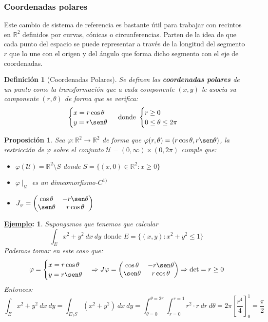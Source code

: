\documentclass[10pt,a4paper,openright]{book}
\theoremstyle{break}
\newtheorem*{defi}{Definición}
\newtheorem*{prop}{Proposición}
\newtheorem*{ej}{\underline{Ejemplo}:}
\newcommand{\dif}[1]{\ d#1}
\begin{document}
\subsubsection{Coordenadas polares}
Este cambio de sistema de referencia es bastante útil para trabajar con recintos en $\mathbb{R}^2$ definidos por curvas, cónicas o circunferencias. Parten de la idea de que cada punto del espacio se puede representar a través de la longitud del segmento $r$ que lo une con el origen y del ángulo que forma dicho segmento con el eje de coordenadas.

\begin{defi}[Coordenadas Polares]
Se definen las \textbf{coordenadas polares} de un punto como la transformación que a cada componente $(x,y)$ le asocia su componente $(r, \theta)$ de forma que se verifica:
$$\begin{cases} x = r \cos \theta \\ y = r \sen \theta \end{cases} \mbox{ donde } \begin{cases} r \ge 0\\ 0 \le \theta \le 2\pi \end{cases}$$
\end{defi}

\begin{prop}
Sea $\varphi: \mathbb{R}^2\rightarrow  \mathbb{R}^2$ de forma que $\varphi(r, \theta) = (r\cos\theta, r\sen\theta)$, la restricción de $\varphi$ sobre el conjunto $\mathcal{U} = (0,\infty)\times (0, 2\pi)$ cumple que:
\begin{itemize}
\item $\varphi(\mathcal{U}) = \mathbb{R}^2\setminus{S}$ donde $S = \{(x,0)\in \mathbb{R}^2: x\geq 0\}$
\item $\varphi\mid_\mathcal{U}$ es un dimeomorfismo-$C^{1)}$
\item $J_\varphi = \begin{pmatrix}\cos \theta & -r\sen \theta \\ \sen \theta & r\cos \theta\end{pmatrix}$
\end{itemize}
\end{prop}

\begin{ej}
Supongamos que tenemos que calcular
$$\int_E x^2 + y^2 \dif{x}\dif{y} \mbox{ donde } E = \{\left(x, y\right): x^2 + y^2 \le 1\}$$
Podemos tomar en este caso que:
$$\varphi = \begin{cases} x = r\cos \theta \\ y = r\sen\theta \end{cases} \Rightarrow J\varphi = \begin{pmatrix} \cos \theta & -r\sen \theta \\ \sen \theta & r\cos \theta \end{pmatrix} \Rightarrow \det = r \ge 0$$
Entonces:
$$\int_E x^2 + y^2 \dif{x} \dif{y} = \int_{E\setminus S} \left(x^2 + y^2\right) \dif{x} \dif{y} = \int_{\theta = 0}^{\theta = 2\pi} \int_{r = 0}^{r = 1} r^2 \cdot r \dif{r} \dif{\theta} = 2\pi \left[\frac{r^4}{4}\right]_0^1 = \frac{\pi}{2} $$
\end{ej}
\end{document}
